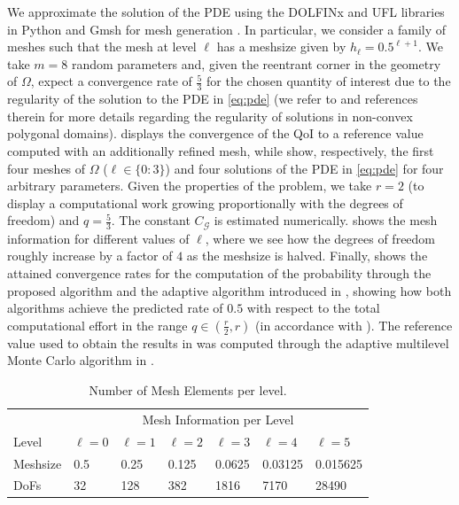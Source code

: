 \documentclass{article}
\newcommand{\cG}{\mathcal{G}}
\theoremstyle{definition}
\begin{document}
We approximate the solution of the PDE using the DOLFINx and UFL libraries in Python \cite{alnaesUnifiedFormLanguage2014,barattaDOLFINxNextGeneration2023} and Gmsh for mesh generation \cite{geuzaineGmsh3DFinite2009}. In particular, we consider a family of meshes such that the mesh at level $\ell$ has a meshsize given by $h_\ell=0.5^{\ell+1}$. We take $m=8$ random parameters and, given the reentrant corner in the geometry of $\Omega$, expect a convergence rate of $\tfrac{5}{3}$ for the chosen quantity of interest due to the regularity of the solution to the PDE in \cref{eq:pde} (we refer to \cite{caiFiniteElementMethod2001,costabelANALYTICREGULARITYLINEAR2012} and references therein for more details regarding the regularity of solutions in non-convex polygonal domains).  displays the convergence of the QoI to a reference value computed with an additionally refined mesh, while  show, respectively, the first four meshes of $\Omega$ ($\ell\in\{0:3\}$) and four solutions of the PDE in \cref{eq:pde} for four arbitrary parameters. Given the properties of the problem, we take $r=2$ (to display a computational work growing proportionally with the degrees of freedom) and $q=\tfrac{5}{3}$. The constant $C_\cG$ is estimated numerically.  shows the mesh information for different values of $\ell$, where we see how the degrees of freedom roughly increase by a factor of $4$ as the meshsize is halved. Finally,  shows the attained convergence rates for the computation of the probability through the proposed algorithm and the adaptive algorithm introduced in \cite{elfversonMultilevelMonteCarlo2016}, showing how both algorithms achieve the predicted rate of $0.5$ with respect to the total computational effort in the range $q\in(\tfrac{r}{2},r)$ (in accordance with ). The reference value used to obtain the results in  was computed through the adaptive multilevel Monte Carlo algorithm in \cite{elfversonMultilevelMonteCarlo2016}.

\begin{table}[]
  \centering
  \begin{tabular}{l|llllll}
    &\multicolumn{6}{c}{Mesh Information  per Level} \\
    Level &$\ell=0$ & $\ell=1$  & $\ell=2$ & $\ell=3$ & $\ell=4$  & $\ell=5$ \\ \hline
    Meshsize &  0.5 & 0.25 & 0.125 & 0.0625 & 0.03125 & 0.015625\\
    DoFs &  32 & 128 & 382 & 1816 & 7170 & 28490 \\\hline
  \end{tabular}
  \caption{Number of Mesh Elements per level.}
  \label{tab:meshs}
\end{table}
\end{document}
